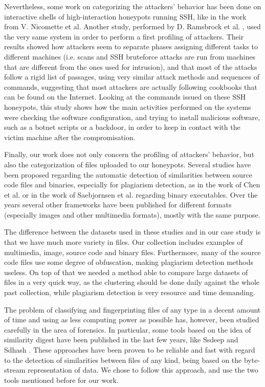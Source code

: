 Nevertheless, some work on categorizing the attackers' behavior has been done on interactive shells of high-interaction honeypots running SSH, like in the work from V. Nicomette et al\cite{highhoney}. Another study, performed by D. Ramsbrock et al. \cite{sshprofiling}, used the very same system in order to perform a first profiling of attackers. Their results showed how attackers seem to separate phases assigning different tasks to different machines (i.e. scans and SSH bruteforce attacks are run from machines that are different from the ones used for intrusion), and that most of the attacks follow a rigid list of passages, using very similar attack methods and sequences of commands, suggesting that most attackers are actually following cookbooks that can be found on the Internet. Looking at the commands issued on these SSH honeypots, this study shows how the main activities performed on the systems were checking the software configuration, and trying to install malicious software, such as a botnet scripts or a backdoor, in order to keep in contact with the victim machine after the compromisation.

Finally, our work does not only concern the profiling of attackers' behavior, but also the categorization of files uploaded to our honeypots. Several studies have been proposed regarding the automatic detection of similarities between source code files and binaries, especially for plagiarism detection, as in the work of Chen et al. \cite{plagdet1} or in the work of Saebjornsen et al. \cite{plagdet2} regarding binary executables. Over the years several other frameworks have been published for different formats (especially images and other multimedia formats), mostly with the same purpose.

The difference between the datasets used in these studies and in our case study is that we have much more variety in files. Our collection includes examples of multimedia, image, source code and binary files. Furthermore, many of the source code files use some degree of obfuscation, making plagiarism detection methods useless. On top of that we needed a method able to compare large datasets of files in a very quick way, as the clustering should be done daily against the whole past collection, while plagiarism detection is very resource and time demanding.

The problem of classifying and fingerprinting files of any type in a decent amount of time and using as less computing power as possible has, however, been studied carefully in the area of forensics. In particular, some tools based on the idea of similarity digest have been published in the last few years, like Ssdeep \cite{ssdeep} and Sdhash \cite{sdhash}. These approaches have been proven to be reliable and fast with regard to the detection of similarities between files of any kind, being based on the byte-stream representation of data. We chose to follow this approach, and use the two tools mentioned before for our work.
